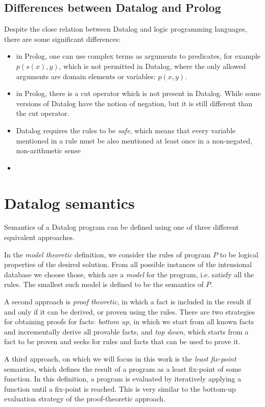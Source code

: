 \documentclass{pracamgr}
\theoremstyle{plain}
\theoremstyle{definition}
\theoremstyle{remark}
\begin{document}
\subsection{Differences between Datalog and Prolog}
Despite the close relation between Datalog and logic programming languages, there are some significant differences:
\begin{itemize}
\item in Prolog, one can use complex terms as arguments to predicates, for example $p(s(x), y)$, which is not permitted in Datalog, where the only allowed arguments are domain elements or variables: $p(x, y)$.
\item in Prolog, there is a cut operator which is not present in Datalog. While some versions of Datalog have the notion of negation, but it is still different than the cut operator.
\item Datalog requires the rules to be \emph{safe}, which means that every variable mentioned in a rule must be also mentioned at least once in a non-negated, non-arithmetic sense
\item 
\end{itemize}


\section{Datalog semantics}
Semantics of a Datalog program can be defined using one of three different equivalent approaches.

In the \emph{model theoretic} definition, we consider the rules of program $P$ to be logical properties of the desired solution. From all possible instances of the intensional database we choose those, which are a \emph{model} for the program, i.e. satisfy all the rules. The smallest such model is defined to be the semantics of $P$.

A second approach is \emph{proof theoretic}, in which a fact is included in the result if and only if it can be derived, or proven using the rules. There are two strategies for obtaining proofs for facts: \emph{bottom up}, in which we start from all known facts and incrementally derive all provable facts, and \emph{top down}, which starts from a fact to be proven and seeks for rules and facts that can be used to prove it.

A third approach, on which we will focus in this work is the \emph{least fix-point} semantics, which defines the result of a program as a least fix-point of some function. In this definition, a program is evaluated by iteratively applying a function until a fix-point is reached. This is very similar to the bottom-up evaluation strategy of the proof-theoretic approach.
\end{document}
